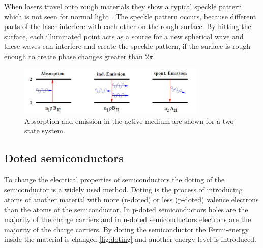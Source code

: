 When lasers travel onto rough materials they show a typical speckle pattern which is not seen for normal light \cite{speckle}.
The speckle pattern occurs, because different parts of the laser interfere with each other on the rough surface.
By hitting the surface, each illuminated point acts as a source for a new spherical wave and these waves can interfere and create the speckle pattern, if the surface is rough enough to create phase changes greater than $2\pi$.

\begin{figure}[ht]
    \center
    \includegraphics[width=0.8\textwidth]{bilder/emission.jpg}
    \caption{Absorption and emission in the active medium are shown for a two state system. \cite{anleitungHeNe}}
    \label{fig:emission}
\end{figure}

\subsection{Doted semiconductors}
\label{sec:doting}
To change the electrical properties of semiconductors the doting of the semiconductor is a widely used method.
Doting is the process of introducing atoms of another material with more (n-doted) or less (p-doted) valence electrons than the atoms of the semiconductor.
In p-doted semiconductors holes are the majority of the charge carriers and in n-doted semiconductors electrons are the majority of the charge carriers.
By doting the semiconductor the Fermi-energy inside the material is changed \ref{fig:doting} and another energy level is introduced.

